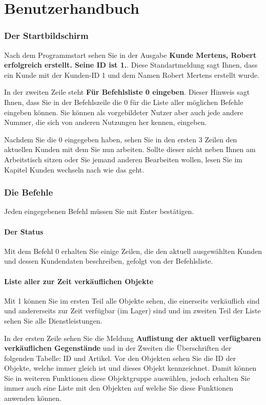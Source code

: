 \documentclass[a4paper,12pt,titlepage]{article}
\begin{document}
\renewcommand\enquote[1]{{\ttfamily \bfseries #1}}

\part{Benutzerhandbuch}
\section{Der Startbildschirm}
Nach dem Programmstart sehen Sie in der Ausgabe \enquote{Kunde Mertens, Robert erfolgreich erstellt. Seine ID ist 1.}.
Diese Standartmeldung sagt Ihnen, dass ein Kunde mit der Kunden-ID 1 und dem Namen Robert Mertens erstellt wurde.

In der zweiten Zeile steht \enquote{Für Befehlsliste 0 eingeben}.
Dieser Hinweis sagt Ihnen, dass Sie in der Befehlszeile die 0 für die Liste aller möglichen Befehle eingeben können.
Sie können als vorgebildeter Nutzer aber auch jede andere Nummer, die sich von anderen Nutzungen her kennen, eingeben.

Nachdem Sie die 0 eingegeben haben, sehen Sie in den ersten 3 Zeilen den aktuellen Kunden mit dem Sie nun arbeiten.
Sollte dieser nicht neben Ihnen am Arbeitstisch sitzen oder Sie jemand anderen Bearbeiten wollen, lesen Sie im Kapitel Kunden wechseln nach wie das geht.

\section{Die Befehle}
Jeden eingegebenen Befehl müssen Sie mit Enter bestätigen.

\subsection{Der Status}
Mit dem Befehl 0 erhalten Sie einige Zeilen, die den aktuell ausgewählten Kunden und dessen Kundendaten beschreiben,
gefolgt von der Befehlsliste.

\subsection{Liste aller zur Zeit verkäuflichen Objekte}
Mit 1 können Sie im ersten Teil alle Objekte sehen,
 die einerseits verkäuflich sind und andererseits zur Zeit verfügbar (im Lager) sind und im zweiten Teil der Liste sehen Sie alle Dienstleistungen.

In der ersten Zeile sehen Sie die Meldung \enquote{Auflistung der aktuell verfügbaren verkäuflichen Gegenstände}
 und in der Zweiten die Überschriften der folgenden Tabelle: ID und Artikel.
Vor den Objekten sehen Sie die ID der Objekte, welche immer gleich ist
 und dieses Objekt kennzeichnet.
Damit können Sie in weiteren Funktionen diese Objektgruppe auswählen,
 jedoch erhalten Sie immer auch eine Liste mit den Objekten auf welche Sie diese Funktionen anwenden können.
\end{document}
